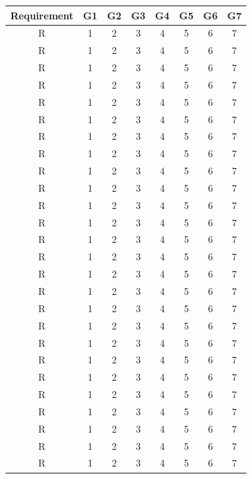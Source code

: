 \setcounter{m}{1}
\newcommand{\mc}{\them\stepcounter{m}}
\renewcommand{\arraystretch}{1.5}
\begin{longtable}{|c|c|c|c|c|c|c|c|}
    \hline \rowcolor{polimiblue!40}
    \textbf{Requirement} & \textbf{G1} & \textbf{G2} & \textbf{G3} & \textbf{G4} & \textbf{G5} & \textbf{G6} & \textbf{G7} \\ \hline
    R\mc & 1 & 2 & 3 & 4 & 5 & 6 & 7 \\ \hline
    R\mc & 1 & 2 & 3 & 4 & 5 & 6 & 7 \\ \hline
    R\mc & 1 & 2 & 3 & 4 & 5 & 6 & 7 \\ \hline
    R\mc & 1 & 2 & 3 & 4 & 5 & 6 & 7 \\ \hline
    R\mc & 1 & 2 & 3 & 4 & 5 & 6 & 7 \\ \hline
    R\mc & 1 & 2 & 3 & 4 & 5 & 6 & 7 \\ \hline
    R\mc & 1 & 2 & 3 & 4 & 5 & 6 & 7 \\ \hline
    R\mc & 1 & 2 & 3 & 4 & 5 & 6 & 7 \\ \hline
    R\mc & 1 & 2 & 3 & 4 & 5 & 6 & 7 \\ \hline
    R\mc & 1 & 2 & 3 & 4 & 5 & 6 & 7 \\ \hline
    R\mc & 1 & 2 & 3 & 4 & 5 & 6 & 7 \\ \hline
    R\mc & 1 & 2 & 3 & 4 & 5 & 6 & 7 \\ \hline
    R\mc & 1 & 2 & 3 & 4 & 5 & 6 & 7 \\ \hline
    R\mc & 1 & 2 & 3 & 4 & 5 & 6 & 7 \\ \hline
    R\mc & 1 & 2 & 3 & 4 & 5 & 6 & 7 \\ \hline
    R\mc & 1 & 2 & 3 & 4 & 5 & 6 & 7 \\ \hline
    R\mc & 1 & 2 & 3 & 4 & 5 & 6 & 7 \\ \hline
    R\mc & 1 & 2 & 3 & 4 & 5 & 6 & 7 \\ \hline
    R\mc & 1 & 2 & 3 & 4 & 5 & 6 & 7 \\ \hline
    R\mc & 1 & 2 & 3 & 4 & 5 & 6 & 7 \\ \hline
    R\mc & 1 & 2 & 3 & 4 & 5 & 6 & 7 \\ \hline
    R\mc & 1 & 2 & 3 & 4 & 5 & 6 & 7 \\ \hline
    R\mc & 1 & 2 & 3 & 4 & 5 & 6 & 7 \\ \hline
    R\mc & 1 & 2 & 3 & 4 & 5 & 6 & 7 \\ \hline
    R\mc & 1 & 2 & 3 & 4 & 5 & 6 & 7 \\ \hline
    R\mc & 1 & 2 & 3 & 4 & 5 & 6 & 7 \\ \hline

\end{longtable}
